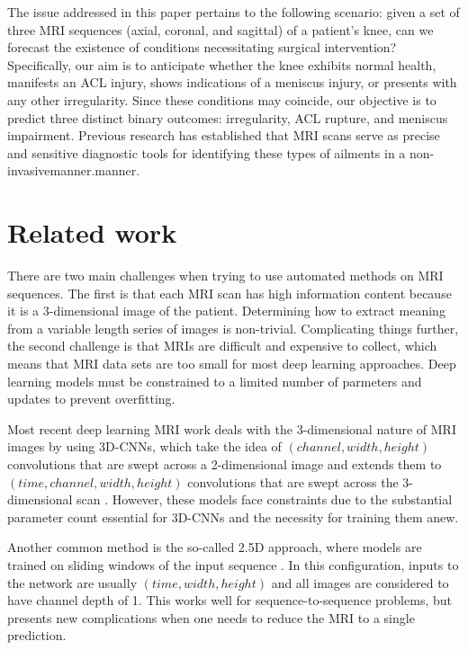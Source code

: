 \documentclass[conference]{IEEEtran}
\begin{document}
The issue addressed in this paper pertains to the following scenario: given a set of three MRI sequences (axial, coronal, and sagittal) of a patient's knee, can we forecast the existence of conditions necessitating surgical intervention? Specifically, our aim is to anticipate whether the knee exhibits normal health, manifests an ACL injury, shows indications of a meniscus injury, or presents with any other irregularity. Since these conditions may coincide, our objective is to predict three distinct binary outcomes: irregularity, ACL rupture, and meniscus impairment. Previous research has established that MRI scans serve as precise and sensitive diagnostic tools for identifying these types of ailments in a non-invasivemanner.manner\cite{boeve1991magnetic,felli2016comparison,yaqoob2015diagnostic}.


\section{Related work}
\label{related-work} 

There are two main challenges when trying to use automated methods on MRI sequences. The first is that each MRI scan has high information content because it is a 3-dimensional image of the patient. Determining how to extract meaning from a variable length series of images is non-trivial. Complicating things further, the second challenge is that MRIs are difficult and expensive to collect, which means that MRI data sets are too small for most deep learning approaches. Deep learning models must be constrained to a limited number of parmeters and updates to prevent overfitting.

Most recent deep learning MRI work deals with the 3-dimensional nature of MRI images by using 3D-CNNs, which take the idea of $(channel, width, height)$ convolutions that are swept across a 2-dimensional image and extends them to $(time, channel, width, height)$ convolutions that are swept across the 3-dimensional scan
\cite{hosseini2016alzheimer,wei2018flair,khvostikov20183d,zou20173d}. 
However, these models face constraints due to the substantial parameter count essential for 3D-CNNs and the necessity for training them anew.






Another common method is the so-called 2.5D approach, where models are trained on sliding windows of the input sequence \cite{roth2015improving,alkadi20182,grovik2019deep}. In this configuration, inputs to the network are usually $(time, width, height)$ and all images are considered to have channel depth of 1. This works well for sequence-to-sequence problems, but presents new complications when one needs to reduce the MRI to a single prediction.
\end{document}
